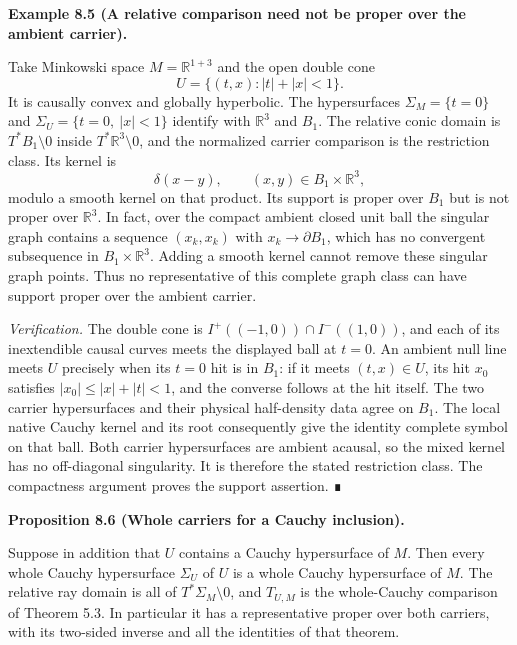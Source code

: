 \documentclass[
  english,
  11pt,
  reqno]{amsart}
\makeatletter
\newcommand{\pandocstatementheading}[1]{%
  \par\if@nobreak\else
    \addpenalty{\@beginparpenalty}%
    \addvspace{.5\baselineskip plus .2\baselineskip minus .2\baselineskip}%
  \fi
  {\normalfont\bfseries #1\par}%
  \nobreak\@afterindenttrue\@afterheading
}
\makeatother
\begin{document}
\pandocstatementheading{\protect{}\label{ex:relative-carrier-nonproperness}Example 8.5 (A relative comparison need not be proper over the ambient
carrier).}

Take Minkowski space \(M=\mathbb R^{1+3}\) and the open double cone \[
U=\{(t,x):|t|+|x|<1\}.
\] It is causally convex and globally hyperbolic. The hypersurfaces
\(\Sigma_M=\{t=0\}\) and \(\Sigma_U=\{t=0,\ |x|<1\}\) identify with
\(\mathbb R^3\) and \(B_1\). The relative conic domain is
\(T^*B_1\setminus0\) inside \(T^*\mathbb R^3\setminus0\), and the
normalized carrier comparison is the restriction class. Its kernel is \[
\delta(x-y),\qquad (x,y)\in B_1\times\mathbb R^3,
\] modulo a smooth kernel on that product. Its support is proper over
\(B_1\) but is not proper over \(\mathbb R^3\). In fact, over the
compact ambient closed unit ball the singular graph contains a sequence
\((x_k,x_k)\) with \(x_k\to\partial B_1\), which has no convergent
subsequence in \(B_1\times\mathbb R^3\). Adding a smooth kernel cannot
remove these singular graph points. Thus no representative of this
complete graph class can have support proper over the ambient carrier.

\emph{Verification.} The double cone is \(I^+((-1,0))\cap I^-((1,0))\),
and each of its inextendible causal curves meets the displayed ball at
\(t=0\). An ambient null line meets \(U\) precisely when its \(t=0\) hit
is in \(B_1\): if it meets \((t,x)\in U\), its hit \(x_0\) satisfies
\(|x_0|\le |x|+|t|<1\), and the converse follows at the hit itself. The
two carrier hypersurfaces and their physical half-density data agree on
\(B_1\). The local native Cauchy kernel and its root consequently give
the identity complete symbol on that ball. Both carrier hypersurfaces
are ambient acausal, so the mixed kernel has no off-diagonal
singularity. It is therefore the stated restriction class. The
compactness argument proves the support assertion. ∎

\pandocstatementheading{\protect{}\label{prop:cauchy-open-whole-carriers}Proposition 8.6 (Whole carriers for a Cauchy inclusion).}

Suppose in addition that \(U\) contains a Cauchy hypersurface of \(M\).
Then every whole Cauchy hypersurface \(\Sigma_U\) of \(U\) is a whole
Cauchy hypersurface of \(M\). The relative ray domain is all of
\(T^*\Sigma_M\setminus0\), and \(T_{U,M}\) is the whole-Cauchy
comparison of Theorem 5.3. In particular it has a representative proper
over both carriers, with its two-sided inverse and all the identities of
that theorem.
\end{document}
